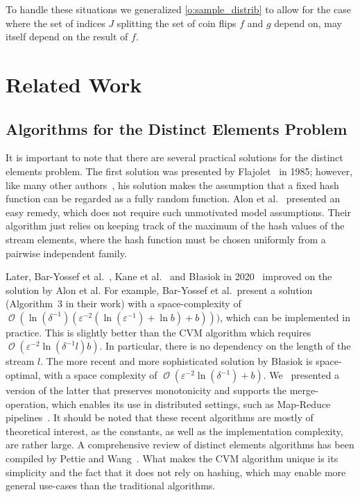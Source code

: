 \documentclass[a4paper,UKenglish,cleveref, autoref, thm-restate]{lipics-v2021}
\DeclareMathOperator{\bigo}{\mathcal O}
\begin{document}
To handle these situations we generalized \cref{o:sample_distrib} to allow for the case where the set of indices $J$ splitting the set of coin flips $f$ and $g$ depend on, may itself depend on the result of $f$.

\section{Related Work}\label{sec:related_work}
\subsection{Algorithms for the Distinct Elements Problem}
It is important to note that there are several practical solutions for the distinct elements problem.
The first solution was presented by Flajolet~\cite{flajolet1985} in 1985; however, like many other authors~\cite{flajolet2007,heule2013}, his solution makes the assumption that a fixed hash function can be regarded as a fully random function.
Alon et al.~\cite[Section 2.3]{alon1999} presented an easy remedy, which does not require such unmotivated model assumptions.
Their algorithm just relies on keeping track of the maximum of the hash values of the stream elements, where the hash function must be chosen uniformly from a pairwise independent family.

Later, Bar-Yossef et al.~\cite{baryossef2002}, Kane et al.~\cite{kane2010} and B\l{}asiok in 2020~\cite{blasiok2020} improved on the solution by Alon et al.
For example, Bar-Yossef et al.\ present a solution (Algorithm~3 in their work) with a space-complexity of $\bigo(\ln (\delta^{-1}) (\varepsilon^{-2}(\ln(\varepsilon^{-1})+\ln b) + b)))$, which can be implemented in practice.
This is slightly better than the CVM algorithm which requires $\bigo(\varepsilon^{-2} \ln (\delta^{-1}l) b)$. In particular, there is no dependency on the length of the stream $l$.
The more recent and more sophisticated solution by B\l{}asiok is space-optimal, with a space complexity of $\bigo(\varepsilon^{-2} \ln (\delta^{-1}) + b)$.
We~\cite{karayel2023} presented a version of the latter that preserves monotonicity and supports the merge-operation, which enables its use in distributed settings, such as Map-Reduce pipelines~\cite{dean2010}.
It should be noted that these recent algorithms are mostly of theoretical interest, as the constants, as well as the implementation complexity, are rather large.
A comprehensive review of distinct elements algorithms has been compiled by Pettie and Wang~\cite[Table~1]{pettie2021}.
What makes the CVM algorithm unique is its simplicity and the fact that it does not rely on hashing, which may enable more general use-cases than the traditional algorithms.
\end{document}
